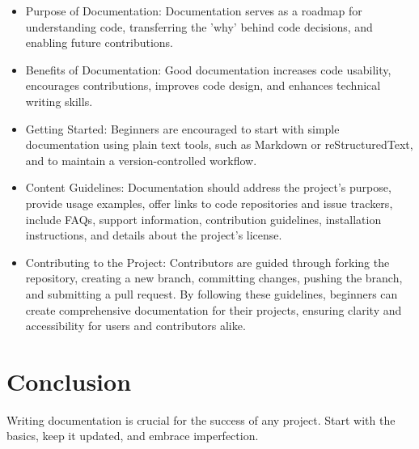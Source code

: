 \documentclass{article}
\begin{document}
\begin{itemize}
    \item Purpose of Documentation: Documentation serves as a roadmap for understanding code, transferring the 'why' behind code decisions, and enabling future contributions.
    \item Benefits of Documentation: Good documentation increases code usability, encourages contributions, improves code design, and enhances technical writing skills.
    \item Getting Started: Beginners are encouraged to start with simple documentation using plain text tools, such as Markdown or reStructuredText, and to maintain a version-controlled workflow.
    \item Content Guidelines: Documentation should address the project's purpose, provide usage examples, offer links to code repositories and issue trackers, include FAQs, support information, contribution guidelines, installation instructions, and details about the project's license.
    \item Contributing to the Project: Contributors are guided through forking the repository, creating a new branch, committing changes, pushing the branch, and submitting a pull request.
    By following these guidelines, beginners can create comprehensive documentation for their projects, ensuring clarity and accessibility for users and contributors alike.
\end{itemize}


\section{Conclusion}
Writing documentation is crucial for the success of any project. Start with the basics, keep it updated, and embrace imperfection.
\end{document}
